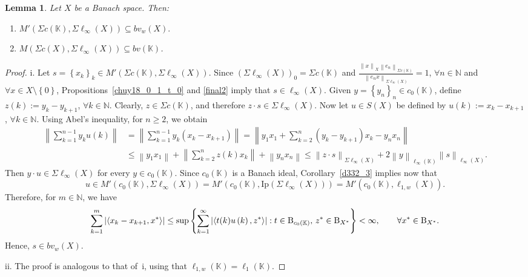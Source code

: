\documentclass[14pt, a4paper]{article}  %
\providecommand{\llave}[1]{\left\lbrace #1\right\rbrace }
\providecommand{\pare}[1]{\left( #1\right) }
\providecommand{\norm}[1]{\left\lVert#1\right\rVert}
\providecommand{\abs}[1]{\left\lvert#1\right\rvert}
\providecommand{\Sum}[1]{\displaystyle\sum#1}
\newcommand{\K}{\mathbb{K}}
\newcommand{\N}{\mathbb{N}}
\newcommand{\B}{\textup{B}}
\newcommand{\la}{\left\langle}
\newcommand{\ra}{\right\rangle}
\newtheorem{lemma}{Lemma}[section]
\begin{document}
 

 
	
	\begin{lemma}
		 Let $X$ be a Banach space. Then:
		\begin{enumerate}
			\item[i.] $M'\pare{\Sigma c\pare{\K},\Sigma \ell_{\infty}\pare{X}}
			\subseteq 
			bv_w(X).$
			\item[ii.] $M\pare{\Sigma c\pare{X},\Sigma \ell_{\infty}\pare{X}}
			\subseteq 
			bv\pare{\K}$.
		\end{enumerate} 
	\end{lemma} 
	
	\begin{proof}
		i. Let $s=\llave{x_{k}}_{k}\in M'\pare{\Sigma c\pare{\K},\Sigma \ell_{\infty}\pare{X}}$. Since $\pare{\Sigma \ell_{\infty}\pare{X}}_{0}=\Sigma c\pare{\K}$ and $\frac{\norm{x}_{X}\norm{e_{n}}_{\Sigma c\pare{\K}}}{\norm{e_{n}x}_{\Sigma \ell_{\infty}\pare{X}}}=1$, $\forall n\in \N$ and $\forall x\in X\setminus\llave{0}$, Propositions~\ref{chuy18_0_1_t_0} and \ref{final2} imply that $s\in \ell_{\infty}\pare{X}$. Given $y=\llave{y_{n}}_{n}\in c_{0}\pare{\K}$, define $z\pare{k}:=y_{k}-y_{k+1}$, $\forall k\in \N$. Clearly, $z\in \Sigma c\pare{\K}$, and therefore $z\cdot s\in \Sigma \ell_{\infty}\pare{X}$. Now let $u\in S\pare{X}$ be defined by $u\pare{k}:=x_{k}-x_{k+1}$, $\forall k\in \N$.  Using Abel's inequality, for $n\geq 2$, we obtain
		\begin{align}
			\norm{\sum_{k=1}^{n-1}y_{k}u\pare{k}}
			&=
			\norm{\sum_{k=1}^{n-1}y_{k}\pare{x_{k}-x_{k+1}}}
			=
			\norm{y_{1}x_{1}+\sum_{k=2}^{n}\pare{y_{k}-y_{k+1}}x_{k}-y_{n}x_{n}}
			\nonumber\\
			&\leq
			\norm{y_{1}x_{1}}
			+
			\norm{\sum_{k=2}^{n}z\pare{k}x_{k}}
			+
			\norm{y_{n}x_{n}}
			\leq
			\norm{z\cdot s}_{\Sigma \ell_{\infty}\pare{X}}
			+
			2\norm{y}_{\ell_{\infty}\pare{\K}}\norm{s}_{\ell_{\infty}\pare{X}}.
		\end{align}
		Then $y\cdot u\in \Sigma \ell_{\infty}\pare{X}$ for every $y\in c_{0}\pare{\K}$. Since $c_{0}\pare{\K}$ is a Banach ideal, Corollary~\ref{d332_3} implies now that
		\begin{equation}
		u\in M'\pare{c_{0}\pare{\K},\Sigma \ell_{\infty}\pare{X}}
			= M'\pare{c_{0}\pare{\K},\text{Ip}\pare{\Sigma \ell_{\infty}\pare{X}}}
			= M'\pare{c_{0}\pare{\K},\ell_{1,w}\pare{X}}.
		\end{equation}
		Therefore, for $m\in \N$, we have 
		\begin{equation}
			\Sum_{k=1}^{m}\abs{\la x_{k}-x_{k+1},x^{*}\ra}
			\leq
			\sup\llave{\Sum_{k=1}^{\infty}\abs{\la t(k)u\pare{k},z^{*}\ra}: t\in \B_{c_{0}\pare{\K}},\, z^{*}\in \B_{X^{*}}}
			<
			\infty,
			\qquad \forall x^{*}\in \B_{X^{*}}.
		\end{equation}
		Hence, $s\in bv_w\pare{X}$.
		
		ii. The proof is analogous to that of~i, using that
		$
		\ell_{1,w}\pare{\K}=\ell_{1}\pare{\K}.
		$
	\end{proof}
	
\end{document}

